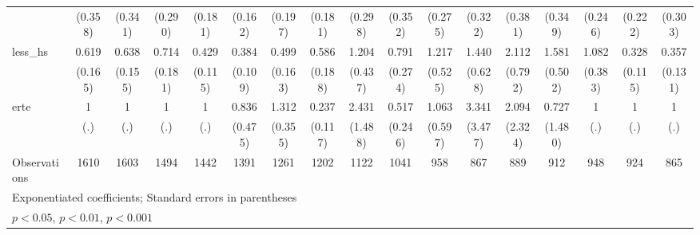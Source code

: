 {\begin{tabular}{l*{16}{c}}
                    &     (0.358)         &     (0.341)         &     (0.290)         &     (0.181)         &     (0.162)         &     (0.197)         &     (0.181)         &     (0.298)         &     (0.352)         &     (0.275)         &     (0.322)         &     (0.381)         &     (0.349)         &     (0.246)         &     (0.222)         &     (0.303)         \\
[1em]
less\_hs             &       0.619         &       0.638         &       0.714         &       0.429\sym{**} &       0.384\sym{***}&       0.499\sym{*}  &       0.586         &       1.204         &       0.791         &       1.217         &       1.440         &       2.112\sym{*}  &       1.581         &       1.082         &       0.328\sym{**} &       0.357\sym{**} \\
                    &     (0.165)         &     (0.155)         &     (0.181)         &     (0.115)         &     (0.109)         &     (0.163)         &     (0.188)         &     (0.437)         &     (0.274)         &     (0.525)         &     (0.628)         &     (0.792)         &     (0.502)         &     (0.383)         &     (0.115)         &     (0.131)         \\
[1em]
erte                &           1         &           1         &           1         &           1         &       0.836         &       1.312         &       0.237\sym{**} &       2.431         &       0.517         &       1.063         &       3.341         &       2.094         &       0.727         &           1         &           1         &           1         \\
                    &         (.)         &         (.)         &         (.)         &         (.)         &     (0.475)         &     (0.355)         &     (0.117)         &     (1.488)         &     (0.246)         &     (0.597)         &     (3.477)         &     (2.324)         &     (1.480)         &         (.)         &         (.)         &         (.)         \\
\hline
Observations        &        1610         &        1603         &        1494         &        1442         &        1391         &        1261         &        1202         &        1122         &        1041         &         958         &         867         &         889         &         912         &         948         &         924         &         865         \\
\hline\hline
\multicolumn{17}{l}{\footnotesize Exponentiated coefficients; Standard errors in parentheses}\\
\multicolumn{17}{l}{\footnotesize \sym{*} \(p<0.05\), \sym{**} \(p<0.01\), \sym{***} \(p<0.001\)}\\
\end{tabular}
}
